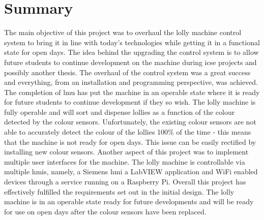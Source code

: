 \section{Summary}
    The main objective of this project was to overhaul the lolly machine control system to bring it in line with today's technologies while getting it in a functional state for open days. The idea behind the upgrading the control system is to allow future students to continue development on the machine during \acrshort{icse} projects and possibly another thesis. 
    The overhaul of the control system was a great success and everything, from an installation and programming perspective, was achieved. The completion of \acrfull{lmu} has put the machine in an operable state where it is ready for future students to continue development if they so wish. The lolly machine is fully operable and will sort and dispense lollies as a function of the colour detected by the colour sensors. Unfortunately, the existing colour sensors are not able to accurately detect the colour of the lollies 100\% of the time - this means that the machine is not ready for open days. This issue can be easily rectified by installing new colour sensors. 
    Another aspect of this project was to implement multiple user interfaces for the machine. The lolly machine is controllable via multiple \acrshort{hmi}s, namely, a Siemens \acrshort{hmi} a LabVIEW application and  WiFi enabled devices through a service running on a Raspberry Pi. 
    Overall this project has effectively fulfilled the requirements set out in the initial design. The lolly machine is in an operable state ready for future developments and will be ready for use on open days after the colour sensors have been replaced.